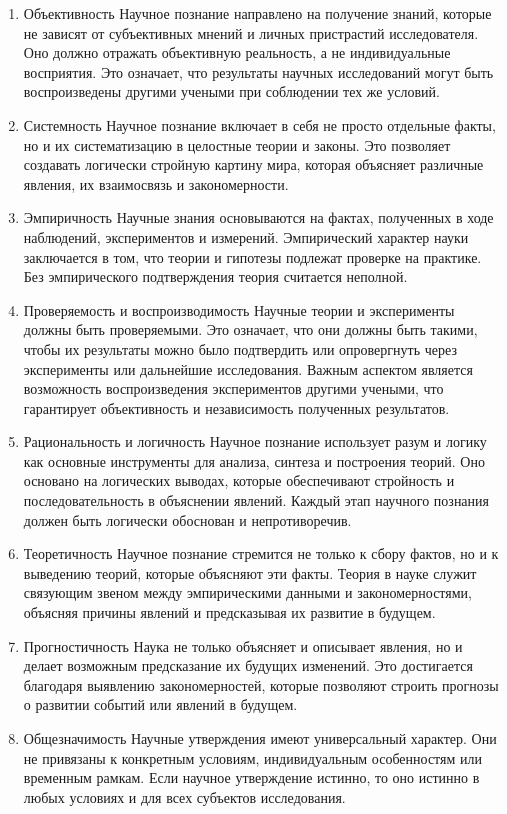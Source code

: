 \documentclass[12pt,a4paper]{article}
\begin{document}
	\begin{enumerate}
		\item Объективность
		Научное познание направлено на получение знаний, которые не зависят от субъективных мнений и личных пристрастий исследователя. Оно должно отражать объективную реальность, а не индивидуальные восприятия. Это означает, что результаты научных исследований могут быть воспроизведены другими учеными при соблюдении тех же условий.
		
		\item Системность
		Научное познание включает в себя не просто отдельные факты, но и их систематизацию в целостные теории и законы. Это позволяет создавать логически стройную картину мира, которая объясняет различные явления, их взаимосвязь и закономерности.
		
		\item Эмпиричность
		Научные знания основываются на фактах, полученных в ходе наблюдений, экспериментов и измерений. Эмпирический характер науки заключается в том, что теории и гипотезы подлежат проверке на практике. Без эмпирического подтверждения теория считается неполной.
		
		\item Проверяемость и воспроизводимость
		Научные теории и эксперименты должны быть проверяемыми. Это означает, что они должны быть такими, чтобы их результаты можно было подтвердить или опровергнуть через эксперименты или дальнейшие исследования. Важным аспектом является возможность воспроизведения экспериментов другими учеными, что гарантирует объективность и независимость полученных результатов.
		
		\item Рациональность и логичность
		Научное познание использует разум и логику как основные инструменты для анализа, синтеза и построения теорий. Оно основано на логических выводах, которые обеспечивают стройность и последовательность в объяснении явлений. Каждый этап научного познания должен быть логически обоснован и непротиворечив.
		
		\item Теоретичность
		Научное познание стремится не только к сбору фактов, но и к выведению теорий, которые объясняют эти факты. Теория в науке служит связующим звеном между эмпирическими данными и закономерностями, объясняя причины явлений и предсказывая их развитие в будущем.
		
		\item Прогностичность
		Наука не только объясняет и описывает явления, но и делает возможным предсказание их будущих изменений. Это достигается благодаря выявлению закономерностей, которые позволяют строить прогнозы о развитии событий или явлений в будущем.
		
		\item Общезначимость
		Научные утверждения имеют универсальный характер. Они не привязаны к конкретным условиям, индивидуальным особенностям или временным рамкам. Если научное утверждение истинно, то оно истинно в любых условиях и для всех субъектов исследования.
	\end{enumerate}
	
\end{document}
